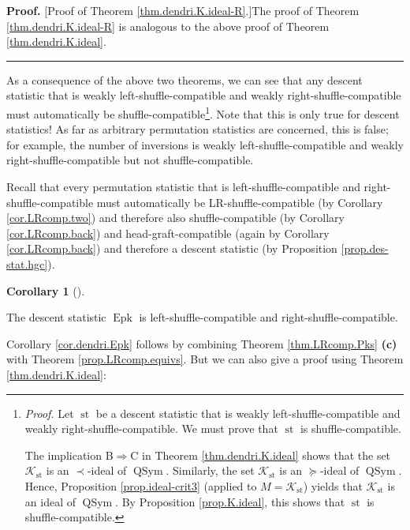 \documentclass[numbers=enddot,12pt,final,onecolumn,notitlepage]{scrartcl}%
\theoremstyle{definition}
\newtheorem{coro}[theo]{Corollary}
\newenvironment{corollary}[1][]
{\begin{coro}[#1]\begin{leftbar}}
{\end{leftbar}\end{coro}}
\newenvironment{proof}[1][Proof]{\noindent\textbf{#1.} }{\ \rule{0.5em}{0.5em}}
\begin{document}
\begin{proof}
[Proof of Theorem \ref{thm.dendri.K.ideal-R}.]The proof of Theorem
\ref{thm.dendri.K.ideal-R} is analogous to the above proof of Theorem
\ref{thm.dendri.K.ideal}.
\end{proof}

As a consequence of the above two theorems, we can see that any descent
statistic that is weakly left-shuffle-compatible and weakly
right-shuffle-compatible must automatically be
shuffle-compatible\footnote{\textit{Proof.} Let $\operatorname*{st}$ be a
descent statistic that is weakly left-shuffle-compatible and weakly
right-shuffle-compatible. We must prove that $\operatorname*{st}$ is
shuffle-compatible.
\par
The implication B$\Longrightarrow$C in Theorem \ref{thm.dendri.K.ideal} shows
that the set $\mathcal{K}_{\operatorname*{st}}$ is an $\left.  \prec\right.
$-ideal of $\operatorname*{QSym}$. Similarly, the set $\mathcal{K}%
_{\operatorname*{st}}$ is an $\left.  \succeq\right.  $-ideal of
$\operatorname*{QSym}$. Hence, Proposition \ref{prop.ideal-crit3} (applied to
$M=\mathcal{K}_{\operatorname*{st}}$) yields that $\mathcal{K}%
_{\operatorname*{st}}$ is an ideal of $\operatorname*{QSym}$. By Proposition
\ref{prop.K.ideal}, this shows that $\operatorname*{st}$ is
shuffle-compatible.}. Note that this is only true for descent statistics! As
far as arbitrary permutation statistics are concerned, this is false; for
example, the number of inversions is weakly left-shuffle-compatible and weakly
right-shuffle-compatible but not shuffle-compatible.

Recall that every permutation statistic that is left-shuffle-compatible and
right-shuffle-compatible must automatically be LR-shuffle-compatible (by
Corollary \ref{cor.LRcomp.two}) and therefore also shuffle-compatible (by
Corollary \ref{cor.LRcomp.back}) and head-graft-compatible (again by Corollary
\ref{cor.LRcomp.back}) and therefore a descent statistic (by Proposition
\ref{prop.des-stat.hgc}).

\begin{corollary}
\label{cor.dendri.Epk}The descent statistic $\operatorname*{Epk}$ is
left-shuffle-compatible and right-shuffle-compatible.
\end{corollary}

Corollary \ref{cor.dendri.Epk} follows by combining Theorem
\ref{thm.LRcomp.Pks} \textbf{(c)} with Theorem \ref{prop.LRcomp.equivs}. But
we can also give a proof using Theorem \ref{thm.dendri.K.ideal}:
\end{document}
